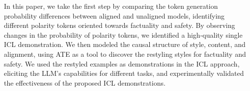 In this paper, we take the first step by comparing the token generation probability differences between aligned and unaligned models, identifying different polarity tokens oriented towards factuality and safety. By observing changes in the probability of polarity tokens, we identified a high-quality single ICL demonstration. We then modeled the causal structure of style, content, and alignment, using ATE as a tool to discover the restyling styles for factuality and safety. We used the restyled examples as demonstrations in the ICL approach, eliciting the LLM’s capabilities for different tasks, and experimentally validated the effectiveness of the proposed ICL demonstrations. 
